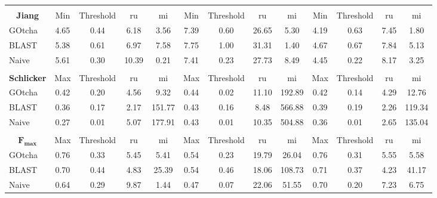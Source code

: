 \begin{table}[h!]
{\begin{tabular}{c|cccc|cccc|cccc}
\multicolumn{1}{l}{\hphantom} & & & &\multicolumn{1}{c}{\hphantom} & & & & \multicolumn{1}{c}{\hphantom} & & & &\\

\bf Jiang & Min & Threshold & ru & mi & Min & Threshold & ru & mi & Min & Threshold & ru & mi\\
\hline
\multicolumn{1}{l|}{GOtcha}& 4.65 & 0.44 & 6.18 & 3.56 & 7.39 & 0.60 & 26.65 & 5.30 & 4.19 & 0.63 & 7.45 & 1.80 \\
\multicolumn{1}{l|}{BLAST}& 5.38 & 0.61 & 6.97 & 7.58 & 7.75 & 1.00 & 31.31 & 1.40 & 4.67 & 0.67 & 7.84 & 5.13 \\
\multicolumn{1}{l|}{Naive}& 5.61 & 0.30 & 10.39 & 0.21 & 7.41 & 0.23 & 27.73 & 8.49 & 4.45 & 0.22 & 8.17 & 3.25 \\


\multicolumn{1}{l}{\hphantom} & & & &\multicolumn{1}{c}{\hphantom} & & & & \multicolumn{1}{c}{\hphantom} & & & &\\

\bf Schlicker & Max & Threshold & ru & mi & Max & Threshold & ru & mi & Max & Threshold & ru & mi\\
\hline
\multicolumn{1}{l|}{GOtcha}& 0.42 & 0.20 & 4.56 & 9.32 & 0.44 & 0.02 & 11.10 & 192.89 & 0.42 & 0.14 & 4.29 & 12.76 \\
\multicolumn{1}{l|}{BLAST}& 0.36 & 0.17 & 2.17 & 151.77 & 0.43 & 0.16 & 8.48 & 566.88 & 0.39 & 0.19 & 2.26 & 119.34 \\
\multicolumn{1}{l|}{Naive}& 0.27 & 0.01 & 5.07 & 177.91 & 0.43 & 0.01 & 10.35 & 504.88 & 0.36 & 0.01 & 2.65 & 135.04 \\

\multicolumn{1}{l}{\hphantom} & & & &\multicolumn{1}{c}{\hphantom} & & & & \multicolumn{1}{c}{\hphantom} & & & &\\

$\mathbf{ F_{max} }$ & Max & Threshold & ru & mi & Max & Threshold & ru & mi & Max & Threshold & ru & mi\\
\hline
\multicolumn{1}{l|}{GOtcha}& 0.76 & 0.33 & 5.45 & 5.41 & 0.54 & 0.23 & 19.79 & 26.04 & 0.76 & 0.31 & 5.55 & 5.58 \\
\multicolumn{1}{l|}{BLAST}& 0.70 & 0.44 & 4.83 & 25.39 & 0.54 & 0.46 & 18.06 & 108.73 & 0.71 & 0.37 & 4.23 & 41.17 \\
\multicolumn{1}{l|}{Naive}& 0.64 & 0.29 & 9.87 & 1.44 & 0.47 & 0.07 & 22.06 & 51.55 & 0.70 & 0.20 & 7.23 & 6.75 \\


\end{tabular}}{}
\end{table}


